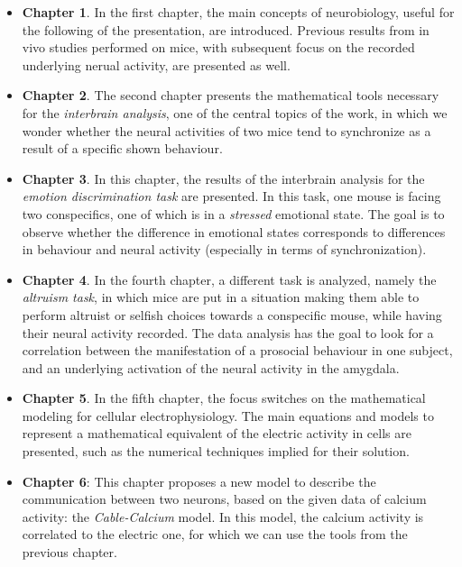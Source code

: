 \documentclass[12pt, a4paper]{report}
\begin{document}
	\begin{itemize}
		\item \textbf{Chapter 1}. In the first chapter, the main concepts of neurobiology, useful for the following of the presentation, are introduced. Previous results from in vivo studies performed on mice, with subsequent focus on the recorded underlying nerual activity, are presented as well. 
		
		\item \textbf{Chapter 2}. The second chapter presents the mathematical tools necessary for the \textit{interbrain analysis}, one of the central topics of the work, in which we wonder whether the neural activities of two mice tend to synchronize as a result of a specific shown behaviour. 
		
		\item \textbf{Chapter 3}. In this chapter, the results of the interbrain analysis for the \textit{emotion discrimination task} are presented. In this task, one mouse is facing two conspecifics, one of which is in a \textit{stressed} emotional state. The goal is to observe whether the difference in emotional states corresponds to differences in behaviour and neural activity (especially in terms of synchronization).
		
		\item \textbf{Chapter 4}. In the fourth chapter, a different task is analyzed, namely the \textit{altruism task}, in which mice are put in a situation making them able to perform altruist or selfish choices towards a conspecific mouse, while having their neural activity recorded. The data analysis has the goal to look for a correlation between the manifestation of a prosocial behaviour in one subject, and an underlying activation of the neural activity in the amygdala.
		
		\item \textbf{Chapter 5}. In the fifth chapter, the focus switches on the mathematical modeling for cellular electrophysiology. The main equations and models to represent a mathematical equivalent of the electric activity in cells are presented, such as the numerical techniques implied for their solution.
		
		\item \textbf{Chapter 6}: This chapter proposes a new model to describe the communication between two neurons, based on the given data of calcium activity: the \textit{Cable-Calcium} model. In this model, the calcium activity is correlated to the electric one, for which we can use the tools from the previous chapter.
		
		
	\end{itemize}
	
\end{document}
